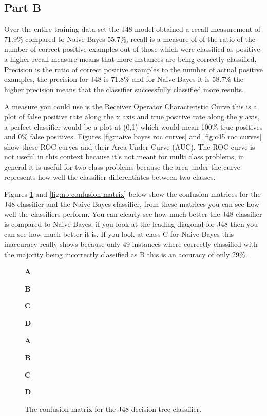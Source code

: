 \documentclass[10pt]{article}
\newcommand\MyBox[1]{%
  \fbox{\parbox[c][.7cm][c]{.7cm}{\centering #1}}%
}
\newcommand\MyVBox[1]{%
  \parbox[c][.7cm][c]{1cm}{\centering\bfseries #1}%
}
\newcommand\MyHBox[2][\dimexpr.7cm+2\fboxsep\relax]{%
  \parbox[c][1cm][c]{#1}{\centering\bfseries #2}%
}
\newcommand\MyTBox[2]{%
  \MyVBox{#1}
  \renewcommand*\do[1]{\MyBox{##1}\hspace*{-\fboxrule}}
  \docsvlist{#2}
  \par\vspace{-\fboxrule}
}
\begin{document}
\newpage
\subsection*{Part B}
Over the entire training data set the J48 model obtained a recall measurement of 71.9\% compared to Naive Bayes 55.7\%, recall is a measure of of the ratio of the number of correct positive examples out of those which were classified as positive\cite{MarslandStephen2015Ml:a} a higher recall measure means that more instances are being correctly classified. Precision is the ratio of correct positive examples to the number of actual positive examples\cite{MarslandStephen2015Ml:a}, the precision for J48 is 71.8\% and for Naive Bayes it is 58.7\% the higher precision means that the classifier successfully classified more results. 

A measure you could use is the Receiver Operator Characteristic Curve this is a plot of false positive rate along the x axis and true positive rate along the y axis, a perfect classifier would be a plot at (0,1) which would mean 100\% true positives and 0\% false positives. Figures \ref{fig:naive bayes roc curves} and \ref{fig:c45 roc curves} show these ROC curves and their Area Under Curve (AUC). The ROC curve is not useful in this context because it's not meant for multi class problems, in general it is useful for two class problems because the area under the curve represents how well the classifier differentiates between two classes.

Figures \ref{fig:j48 confusion matrix} and \ref{fig:nb confusion matrix} below show the confusion matrices for the J48 classifier and the Naive Bayes classifier, from these matrices you can see how well the classifiers perform. You can clearly see how much better the J48 classifier is compared to Naive Bayes, if you look at the leading diagonal for J48 then you can see how much better it is. If you look at class C for Naive Bayes this inaccuracy really shows because only 49 instances where correctly classified with the majority being incorrectly classified as B this is an accuracy of only 29\%. 

\begin{figure}[h]
    \centering
    {
    \offinterlineskip
    \hspace*{1cm}\MyHBox{A}\MyHBox{B}\MyHBox{C}
    \MyHBox{D}\par
    
    \MyTBox{A}{107, 20, 11, 14}
    \MyTBox{B}{23, 103, 20, 13}
    \MyTBox{C}{13, 24, 110,  21}
    \MyTBox{D}{9,  11,  11, 167}
    }
    \caption{The confusion matrix for the J48 decision tree classifier.}
    \label{fig:j48 confusion matrix}
\end{figure}
\end{document}
